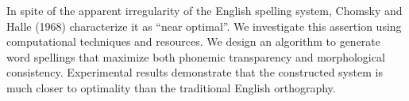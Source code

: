 In spite of the apparent irregularity of the English spelling system, Chomsky and Halle (1968) characterize it as ``near optimal''. We investigate this assertion using computational techniques and resources. We design an algorithm to generate word spellings that maximize both phonemic transparency and morphological consistency. Experimental results demonstrate that the constructed system is much closer to optimality than the traditional English orthography.
